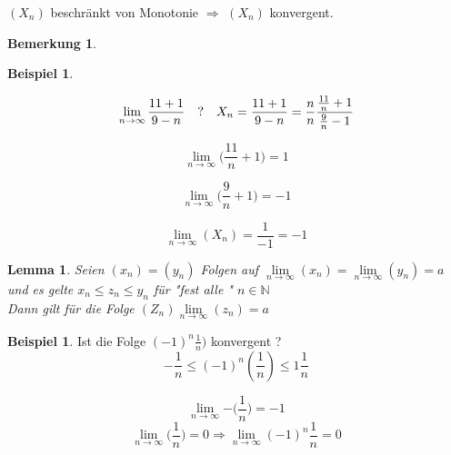 \documentclass[a4paper,12pt,leqno]{report}
\theoremstyle{plain} %
\newtheorem{lemma}[theorem]{Lemma}
\theoremstyle{definition} %
\newtheorem{remark}[theorem]{Bemerkung}
\newtheorem{example}[theorem]{Beispiel}
\begin{document}
$(X_n)$ beschränkt von Monotonie $\Rightarrow$ $(X_n)$ konvergent.

\begin{remark}
\end{remark}

\begin{example}

\end{example}
\begin{equation}
\lim\limits_{n \rightarrow \infty}{\frac{11+1}{9-n}}\quad ? \\
\\\quad X_n = \frac{11+1}{9-n}=\frac{n}{n} \frac{\frac{11}{n}+1}{\frac{9}{n}-1}
\end{equation}

\begin{equation}
\lim\limits_{n \rightarrow \infty}{\bigg(\frac{11}{n}+1\bigg)}=1
\end{equation}

\begin{equation}
\lim\limits_{n \rightarrow \infty}{\bigg(\frac{9}{n}+1\bigg)}=-1
\end{equation}

\begin{equation}
\lim\limits_{n \rightarrow \infty}{(X_n)}= \frac{1}{-1}=-1
\end{equation}

\begin{lemma}
Seien $(x_n)=(y_n)$ Folgen auf $\lim\limits_{n \rightarrow \infty}{(x_n)}= \lim\limits_{n \rightarrow \infty}{(y_n)}= a$ und es gelte
$x_n \leq z_n \leq y_n$ für "fest alle " $n \in \mathbb{N}$\\

Dann gilt für die Folge $(Z_n) \lim\limits_{n \rightarrow \infty}{(z_n)}=a$
\end{lemma}

\begin{example}
Ist die Folge $(-1)^n\frac{1}{n})$ konvergent ?\\

\[ - \frac{1}{n} \leq(-1)^n(\frac{1}{n}) \leq 1 \frac{1}{n}\]

\[ \lim\limits_{n \rightarrow \infty}{- \big(\frac{1}{n} \big)}= -1 \]
\[ \lim\limits_{n \rightarrow \infty}{ \big(\frac{1}{n} \big)}= 0 \Rightarrow \lim\limits_{n \rightarrow \infty}{(-1)^n \frac{1}{n}}= 0
\]
\end{example}
\end{document}
